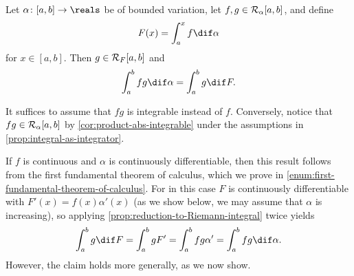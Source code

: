 \documentclass[article, a4paper, 11pt, oneside]{memoir}
\numberwithin{equation}{chapter}
\begin{document}
\begin{proposition}
    \label{prop:integral-as-integrator}
    Let $\alpha \colon [a,b] \to \reals$ be of bounded variation, let $f,g \in \integrable[\alpha]{a,b}$, and define
    \begin{equation*}
        F(x)
            = \int_a^x f \dif\alpha
    \end{equation*}
    for $x \in [a,b]$. Then $g \in \integrable[F]{a,b}$ and
    \begin{equation*}
        \int_a^b fg \dif\alpha
            = \int_a^b g \dif F.
    \end{equation*}
\end{proposition}

\begin{remark}
    It suffices to assume that $fg$ is integrable instead of $f$. Conversely, notice that $fg \in \integrable[\alpha]{a,b}$ by \cref{cor:product-abs-integrable} under the assumptions in \cref{prop:integral-as-integrator}.
    
    If $f$ is continuous and $\alpha$ is continuously differentiable, then this result follows from the first fundamental theorem of calculus, which we prove in \cref{enum:first-fundamental-theorem-of-calculus}. For in this case $F$ is continuously differentiable with $F'(x) = f(x)\alpha'(x)$ (as we show below, we may assume that $\alpha$ is increasing), so applying \cref{prop:reduction-to-Riemann-integral} twice yields
    \begin{equation*}
        \int_a^b g \dif F
            = \int_a^b g F'
            = \int_a^b fg \alpha'
            = \int_a^b fg \dif\alpha.
    \end{equation*}
    However, the claim holds more generally, as we now show.
\end{remark}
\end{document}

